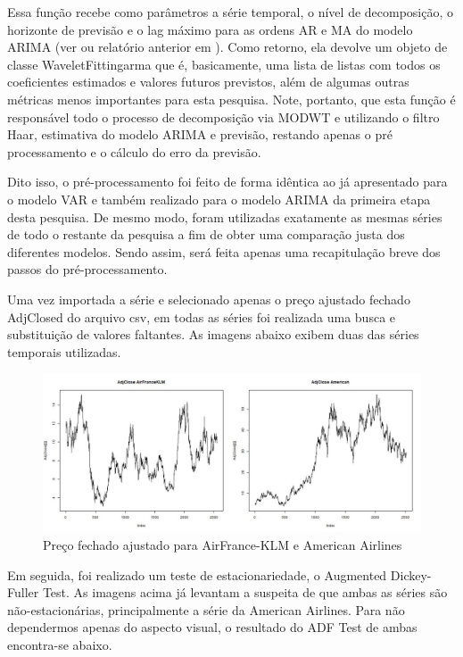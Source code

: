 \documentclass[12pt]{article}
\begin{document}
	Essa função recebe como parâmetros a série temporal, o nível de decomposição, o horizonte de previsão e o \textrm{lag} máximo para as ordens AR e MA do modelo ARIMA (ver \cite{Tsay} ou relatório anterior em \cite{git}). Como retorno, ela devolve um objeto de classe \textrm{WaveletFittingarma} que é, basicamente, uma lista de listas com todos os coeficientes estimados e valores futuros previstos, além de algumas outras métricas menos importantes para esta pesquisa. Note, portanto, que esta função é responsável todo o processo de decomposição via MODWT e utilizando o filtro \textrm{Haar}, estimativa do modelo ARIMA e previsão, restando apenas o pré processamento e o cálculo do erro da previsão.
	
	Dito isso, o pré-processamento foi feito de forma idêntica ao já apresentado para o modelo VAR e também realizado para o modelo ARIMA da primeira etapa desta pesquisa. De mesmo modo, foram utilizadas exatamente as mesmas séries de todo o restante da pesquisa a fim de obter uma comparação justa dos diferentes modelos. Sendo assim, será feita apenas uma recapitulação breve dos passos do pré-processamento. 
	
	Uma vez importada a série e selecionado apenas o preço ajustado fechado \textrm{AdjClosed} do arquivo \textrm{csv}, em todas as séries foi realizada uma busca e substituição de valores faltantes. As imagens abaixo exibem duas das séries temporais utilizadas.
	
	\begin{figure}[H]
		\centering
		\includegraphics[width=1.0\linewidth]{Imagens/AdjCloseWavelets}
		\caption{Preço fechado ajustado para AirFrance-KLM e American Airlines}
		\label{fig:adjclosewavelets}
	\end{figure}
	
	Em seguida, foi realizado um teste de estacionariedade, o \textrm{Augmented Dickey-Fuller Test}. As imagens acima já levantam a suspeita de que ambas as séries são não-estacionárias, principalmente a série da \textrm{American Airlines}. Para não dependermos apenas do aspecto visual, o resultado do \textrm{ADF Test} de ambas encontra-se abaixo.
	
\end{document}
